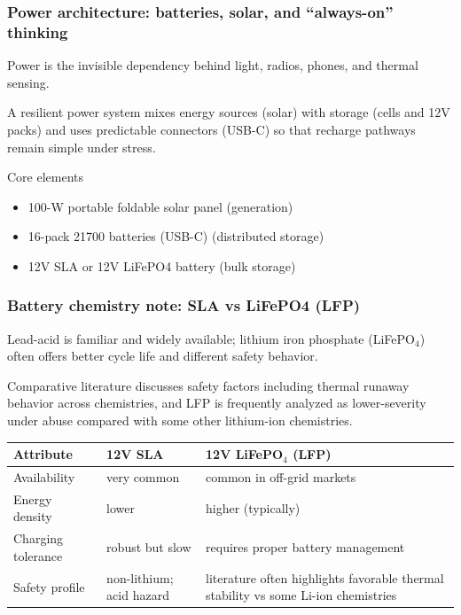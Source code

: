 \begin{frame}[t]
  \frametitle{Power architecture: batteries, solar, and ``always-on'' thinking}
  \justifying
   Power is the invisible dependency behind light, radios, phones, and thermal sensing.

  \vspace{0.5em}
   A resilient power system mixes energy sources (solar) with storage (cells and 12V packs) and uses predictable connectors (USB-C) so that recharge pathways remain simple under stress.

  \vspace{0.8em}
  \begin{block}{Core elements}
    \begin{itemize}
      \item 100-W portable foldable solar panel (generation)
      \item 16-pack 21700 batteries (USB-C) (distributed storage)
      \item 12V SLA or 12V LiFePO4 battery (bulk storage)
    \end{itemize}
  \end{block}
\end{frame}

\begin{frame}[t,shrink=2]
  \frametitle{Battery chemistry note: SLA vs LiFePO4 (LFP)}
  \justifying
   Lead-acid is familiar and widely available; lithium iron phosphate (LiFePO$_4$) often offers better cycle life and different safety behavior.

  \vspace{0.5em}
   Comparative literature discusses safety factors including thermal runaway behavior across chemistries, and LFP is frequently analyzed as lower-severity under abuse compared with some other lithium-ion chemistries.~\cite{battery_compare_2024}

  \vspace{0.8em}
  \TableBodySize
  \begin{table}
    \centering
    \begin{tabularx}{\textwidth}{@{}lX X@{}}
      \toprule
      \textbf{Attribute} & \textbf{12V SLA} & \textbf{12V LiFePO$_4$ (LFP)} \\
      \midrule
      Availability & very common & common in off-grid markets \\
      Energy density & lower & higher (typically) \\
      Charging tolerance & robust but slow & requires proper battery management \\
      Safety profile & non-lithium; acid hazard & literature often highlights favorable thermal stability vs some Li-ion chemistries~\cite{battery_compare_2024} \\
      \bottomrule
    \end{tabularx}
  \end{table}
\end{frame}

